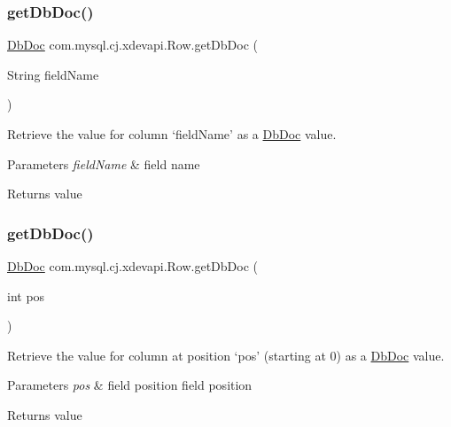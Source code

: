 \subsubsection{\texorpdfstring{get\+Db\+Doc()}{getDbDoc()}\hspace{0.1cm}{\footnotesize\ttfamily [1/2]}}
{\footnotesize\ttfamily \mbox{\hyperlink{interfacecom_1_1mysql_1_1cj_1_1xdevapi_1_1_db_doc}{Db\+Doc}} com.\+mysql.\+cj.\+xdevapi.\+Row.\+get\+Db\+Doc (\begin{DoxyParamCaption}\item[{String}]{field\+Name }\end{DoxyParamCaption})}

Retrieve the value for column `field\+Name' as a \mbox{\hyperlink{interfacecom_1_1mysql_1_1cj_1_1xdevapi_1_1_db_doc}{Db\+Doc}} value.


\begin{DoxyParams}{Parameters}
{\em field\+Name} & field name \\
\hline
\end{DoxyParams}
\begin{DoxyReturn}{Returns}
value 
\end{DoxyReturn}
\mbox{\label{interfacecom_1_1mysql_1_1cj_1_1xdevapi_1_1_row_a563b4f8cb5ae261ea36464e7d335e395}} 
\subsubsection{\texorpdfstring{get\+Db\+Doc()}{getDbDoc()}\hspace{0.1cm}{\footnotesize\ttfamily [2/2]}}
{\footnotesize\ttfamily \mbox{\hyperlink{interfacecom_1_1mysql_1_1cj_1_1xdevapi_1_1_db_doc}{Db\+Doc}} com.\+mysql.\+cj.\+xdevapi.\+Row.\+get\+Db\+Doc (\begin{DoxyParamCaption}\item[{int}]{pos }\end{DoxyParamCaption})}

Retrieve the value for column at position `pos' (starting at 0) as a \mbox{\hyperlink{interfacecom_1_1mysql_1_1cj_1_1xdevapi_1_1_db_doc}{Db\+Doc}} value.


\begin{DoxyParams}{Parameters}
{\em pos} & field position field position \\
\hline
\end{DoxyParams}
\begin{DoxyReturn}{Returns}
value 
\end{DoxyReturn}
\mbox{\label{interfacecom_1_1mysql_1_1cj_1_1xdevapi_1_1_row_aa17f86b07b80d51e90583cce2fdba351}} 
